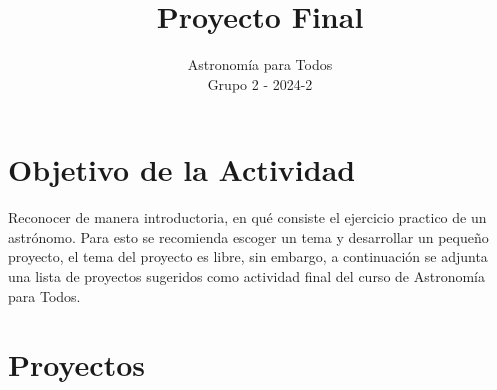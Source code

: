\documentclass[12pt]{article}
\title{Proyecto Final}
\author{Astronomía para Todos \\ Grupo 2 - 2024-2}
\date{}
\begin{document}
\maketitle

\section*{Objetivo de la Actividad}

Reconocer de manera introductoria, en qué consiste el ejercicio practico de un astrónomo. Para esto se recomienda escoger un tema y desarrollar un pequeño proyecto, el tema del proyecto es libre, sin embargo, a continuación se adjunta una lista de proyectos sugeridos como actividad final del curso de Astronomía para Todos.

\section*{Proyectos}
\end{document}
